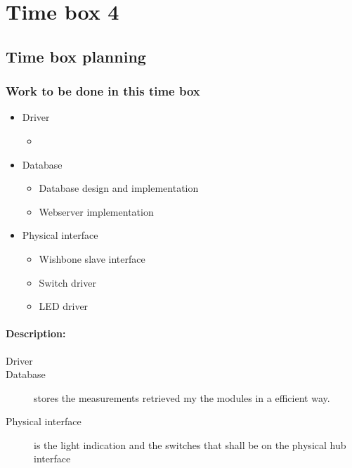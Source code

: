 \section{Time box 4}
\listoftodos
\subsection{Time box planning}
\begin{figure}[H]
	\begin{centering}
	\end{centering}
\end{figure}
\subsubsection{Work to be done in this time box}
\begin{itemize}
	\item Driver
	\begin{itemize}
		\item {}
	\end{itemize}
	\item Database
	\begin{itemize}
		\item Database design and implementation
		\item Webserver implementation
	\end{itemize}
	\item Physical interface
	\begin{itemize}
		\item Wishbone slave interface
		\item Switch driver
		\item LED driver
	\end{itemize}
\end{itemize}
\paragraph{Description:}
\begin{description}
	\item[Driver] 
	\item[Database] stores the measurements retrieved my the modules in a efficient way.
	\item[Physical interface] is the light indication and the switches that shall be on the physical hub interface
\end{description}
